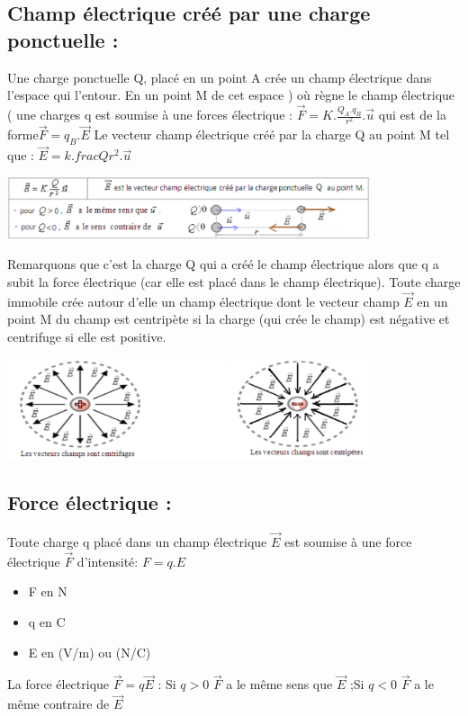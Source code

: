 \documentclass[12pt]{article}
\begin{document}
\subsection{Champ électrique créé par une charge ponctuelle :}
Une charge ponctuelle Q, placé en un point A crée un champ électrique dans l’espace qui l’entour. En un point M de cet espace
) où règne le champ électrique ( une charges q est soumise à une forces électrique : $\vec{F} = K.\frac{Q_A.q_B}{r^2}.\vec{u}$ qui est de la forme$\vec{F} = q_B.\vec{E}$ Le vecteur champ électrique créé par la charge Q au point M tel que : $\vec{E} = k.frac{Q}{r^2}.\vec{u}$
\begin{center}
    \includegraphics[width=0.8\textwidth]{./img/img_03.png}
\end{center}
Remarquons que c’est la charge Q qui a créé le champ électrique alors que q a subit la force électrique (car elle est placé dans le
 champ électrique).
 Toute charge immobile crée autour d’elle un champ électrique dont le vecteur champ
$\vec{E}$ en un point M du champ est centripète si la charge (qui crée le champ) est négative et centrifuge si elle est positive.
\begin{center}
    \includegraphics[width=0.8\textwidth]{./img/img_04.png}
\end{center}

\subsection{Force électrique : }
Toute charge q placé dans un champ électrique $\vec{E}$  est soumise à une force électrique $\vec{F}$ d’intensité: $F = q.E$ 
\begin{itemize}
      \item F en N
      \item q en C
      \item E en (V/m) ou (N/C)
\end{itemize}
La force électrique $\vec{F} = q\vec{E}$ : Si $q>0$ $\vec{F}$ a le même sens que $\vec{E }$  ;Si $q<0$ $\vec{F}$ a le même contraire de $\vec{E}$
\end{document}
